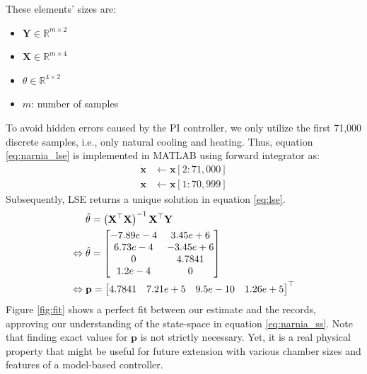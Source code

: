 \documentclass[../main.tex]{subfiles}
\begin{document}
These elements' sizes are:
\begin{multicols}{2}
\begin{itemize}
    \item $\mathbf{Y} \in \mathbb{R}^{m \times 2}$
    \item $\mathbf{X} \in \mathbb{R}^{m \times 4}$
    \item $\theta \in \mathbb{R}^{4 \times 2}$
    \item $m$: number of samples
\end{itemize}
\end{multicols}
To avoid hidden errors caused by the PI controller, we only utilize the first 71,000 discrete samples, i.e., only natural cooling and heating. Thus, equation \ref{eq:narnia_lse} is implemented in MATLAB using forward integrator as:
\begin{equation}
\begin{split}
    \dot{\mathbf{x}} &\leftarrow \mathbf{x}[2:71,000] \\
    \mathbf{x} &\leftarrow \mathbf{x}[1:70,999]
\end{split}
\end{equation}
Subsequently, LSE returns a unique solution in equation \ref{eq:lse}.
\begin{align} \label{eq:lse}
    &\hat{\theta} = \left(\mathbf{X}^\top\mathbf{X}\right)^{-1}\mathbf{X}^\top\mathbf{Y}\\
    \Leftrightarrow { }
    &\hat{\theta} = \begin{bmatrix}
        -7.89e-4 & 3.45e+6 \\
        6.73e-4 & -3.45e+6 \\
        0 & 4.7841 \\
        1.2e-4 & 0
    \end{bmatrix} \notag \\
    \Leftrightarrow { }
    &\mathbf{p} = \begin{bmatrix}
        4.7841 & 7.21e+5 & 9.5e-10 & 1.26e+5
    \end{bmatrix}^\top \notag
\end{align}
Figure \ref{fig:fit} shows a perfect fit between our estimate and the records, approving our understanding of the state-space in equation \ref{eq:narnia_ss}. Note that finding exact values for $\mathbf{p}$ is not strictly necessary. Yet, it is a real physical property that might be useful for future extension with various chamber sizes and features of a model-based controller.
\end{document}
